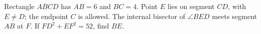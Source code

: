 Rectangle $ABCD$ has $AB=6$ and $BC=4$. Point $E$ lies on segment $CD$, with $E\ne D$; the endpoint $C$ is allowed. The internal bisector of $\angle BED$ meets segment $AB$ at $F$. If $FD^2+EF^2=52$, find $BE$.
